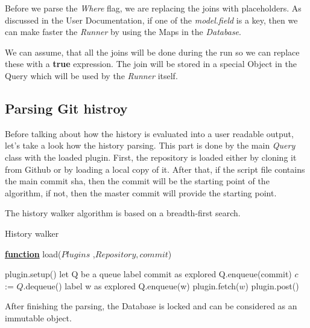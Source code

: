 Before we parse the \textit{Where} flag, we are replacing the joins with placeholders.
As discussed in the User Documentation, if one of the \textit{model.field} is a key, then
we can make faster the \textit{Runner} by using the Maps in the \textit{Database}.

We can assume, that all the joins will be done during the run so we can replace these with a
\textbf{true} expression. The join will be stored in a special Object in the Query which will
be used by the \textit{Runner} itself.

\newpage
\subsection{Parsing Git histroy}

Before talking about how the history is evaluated into a user readable output, let’s take a look
how the history parsing. This part is done by the main \textit{Query} class with the loaded
plugin. First, the repository is loaded either by cloning it from Github or by loading a local copy of it. After that, if the script file contains the main commit sha, then the commit will be the starting point of the algorithm, if not, then the master commit will provide the starting point.

The history walker algorithm is based on a breadth-first search.

\begin{algorithm}[H]
	\caption{History walker} 
	\label{alg:ibb} 
	\textbf{\underline{function}} load($Plugins$ ,$Repository, commit$)
	\begin{algorithmic}[1] %
		\State plugin.setup()
		\EndFor
		\State let Q be a queue
		\State label commit as explored
		\State Q.enqueue(commit)
		\State $c$ := $Q$.dequeue()
		\State label w as explored  
		\State Q.enqueue(w) 
		\State plugin.fetch($w$)
		\EndFor 
		\EndIf
		\EndFor
		\EndWhile
		\State plugin.post()
		\EndFor
	\end{algorithmic}
\end{algorithm}

After finishing the parsing, the Database is locked and can be considered as an immutable object. 

\newpage

